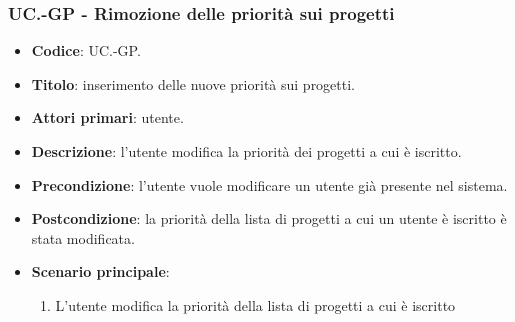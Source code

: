     \subsubsection{UC\theuccount.\thesubuccount-GP - Rimozione delle priorità sui progetti}
    
    \begin{itemize}
        \item \textbf{Codice}: UC\theuccount.\thesubuccount-GP.
        \item \textbf{Titolo}: inserimento delle nuove priorità sui progetti.
        \item \textbf{Attori primari}: utente.
        \item \textbf{Descrizione}: l'utente modifica la priorità dei progetti a cui è iscritto.
        \item \textbf{Precondizione}: l'utente vuole modificare un utente già presente nel sistema.
        \item \textbf{Postcondizione}: la priorità della lista di progetti a cui un utente è iscritto è stata modificata.
        \item \textbf{Scenario principale}:
        \begin{enumerate}
            \item L'utente modifica la priorità della lista di progetti a cui è iscritto
        \end{enumerate}
    \end{itemize}
